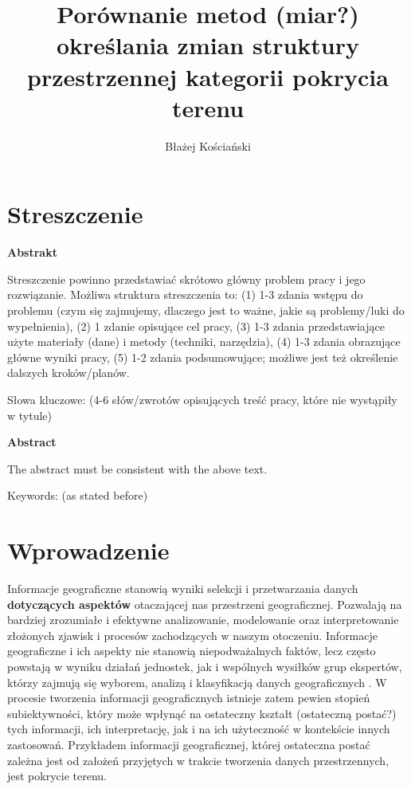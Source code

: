 \documentclass{amuthesis}
\author{Błażej Kościański}
\title{Porównanie metod (miar?) określania zmian struktury przestrzennej
kategorii pokrycia terenu}
\begin{document}

\titlepage


\hypertarget{streszczenie}{%
\chapter*{Streszczenie}\label{streszczenie}}


\textbf{Abstrakt}

Streszczenie powinno przedstawiać skrótowo główny problem pracy i jego
rozwiązanie. Możliwa struktura streszczenia to: (1) 1-3 zdania wstępu do
problemu (czym się zajmujemy, dlaczego jest to ważne, jakie są
problemy/luki do wypełnienia), (2) 1 zdanie opisujące cel pracy, (3) 1-3
zdania przedstawiające użyte materiały (dane) i metody (techniki,
narzędzia), (4) 1-3 zdania obrazujące główne wyniki pracy, (5) 1-2
zdania podsumowujące; możliwe jest też określenie dalszych
kroków/planów.

Słowa kluczowe: (4-6 słów/zwrotów opisujących treść pracy, które nie
wystąpiły w tytule)

\textbf{Abstract}

The abstract must be consistent with the above text.

Keywords: (as stated before)

\newpage

\sf\tighttoc\doublespacing


\hypertarget{sec-wprowadzenie}{%
\chapter{Wprowadzenie}\label{sec-wprowadzenie}}

Informacje geograficzne stanowią wyniki selekcji i przetwarzania danych
\textbf{dotyczących aspektów} otaczającej nas przestrzeni geograficznej.
Pozwalają na bardziej zrozumiałe i efektywne analizowanie, modelowanie
oraz interpretowanie złożonych zjawisk i procesów zachodzących w naszym
otoczeniu. Informacje geograficzne i ich aspekty nie stanowią
niepodważalnych faktów, lecz często powstają w wyniku działań jednostek,
jak i wspólnych wysiłków grup ekspertów, którzy zajmują się wyborem,
analizą i klasyfikacją danych geograficznych \autocite{WhatIsLandCover}.
W procesie tworzenia informacji geograficznych istnieje zatem pewien
stopień subiektywności, który może wpłynąć na ostateczny kształt
(ostateczną postać?) tych informacji, ich interpretację, jak i na ich
użyteczność w kontekście innych zastosowań. Przykładem informacji
geograficznej, której ostateczna postać zależna jest od założeń
przyjętych w trakcie tworzenia danych przestrzennych, jest pokrycie
terenu.
\end{document}
